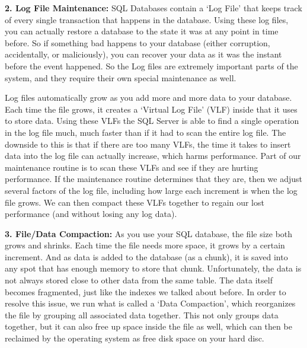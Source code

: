  

\textbf{2. Log File Maintenance:}
SQL Databases contain a ‘Log File’ that keeps track of every single transaction that happens in the database. Using these log files, you can actually restore a database to the state it was at any point in time before. So if something bad happens to your database (either corruption, accidentally, or maliciously), you can recover your data as it was the instant before the event happened. So the Log files are extremely important parts of the system, and they require their own special maintenance as well.

Log files automatically grow as you add more and more data to your database. Each time the file grows, it creates a ‘Virtual Log File’ (VLF) inside that it uses to store data. Using these VLFs the SQL Server is able to find a single operation in the log file much, much faster than if it had to scan the entire log file. The downside to this is that if there are too many VLFs, the time it takes to insert data into the log file can actually increase, which harms performance. Part of our maintenance routine is to scan these VLFs and see if they are hurting performance. If the maintenance routine determines that they are, then we adjust several factors of the log file, including how large each increment is when the log file grows. We can then compact these VLFs together to regain our lost performance (and without losing any log data).

 

\textbf{3. File/Data Compaction:}
As you use your SQL database, the file size both grows and shrinks. Each time the file needs more space, it grows by a certain increment. And as data is added to the database (as a chunk), it is saved into any spot that has enough memory to store that chunk. Unfortunately, the data is not always stored close to other data from the same table. The data itself becomes fragmented, just like the indexes we talked about before. In order to resolve this issue, we run what is called a ‘Data Compaction’, which reorganizes the file by grouping all associated data together. This not only groups data together, but it can also free up space inside the file as well, which can then be reclaimed by the operating system as free disk space on your hard disc.

 

